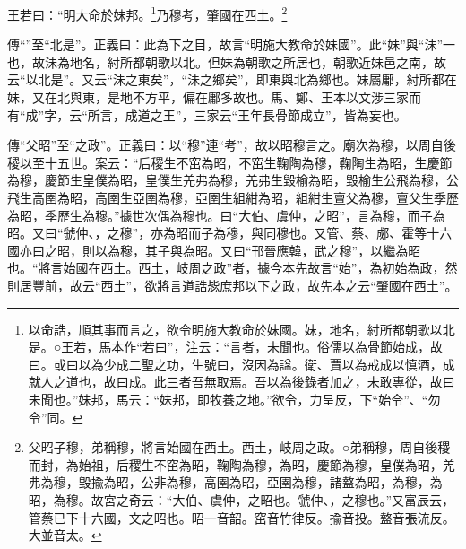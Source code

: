 王若曰：“明大命於妹邦。\footnote{以命誥，順其事而言之，欲令明施大教命於妹國。妹，地名，紂所都朝歌以北是。○王若，馬本作“若曰”，注云：“言者，未聞也。俗儒以為骨節始成，故曰。或曰以為少成二聖之功，生號曰，沒因為諡。衛、賈以為戒成以慎酒，成就人之道也，故曰成。此三者吾無取焉。吾以為後錄者加之，未敢專從，故曰未聞也。”妹邦，馬云：“妹邦，即牧養之地。”欲令，力呈反，下“始令”、“勿令”同。}乃穆考，肇國在西土。\footnote{父昭子穆，弟稱穆，將言始國在西土。西土，岐周之政。○弟稱穆，周自後稷而封，為始祖，后稷生不窋為昭，鞠陶為穆，為昭，慶節為穆，皇僕為昭，羌弗為穆，毀揄為昭，公非為穆，高圉為昭，亞圉為穆，諸盩為昭，為穆，為昭，為穆。故宮之奇云：“大伯、虞仲，之昭也。虢仲、，之穆也。”又富辰云，管蔡已下十六國，文之昭也。昭一音韶。窋音竹律反。揄音投。盩音張流反。大並音太。}


{\noindent\zhuan{}\fzbyks 傳“”至“北是”。正義曰：此為下之目，故言“明施大教命於妹國”。此“妹”與“沬”一也，故沬為地名，紂所都朝歌以北。但妹為朝歌之所居也，朝歌近妹邑之南，故云“以北是”。又云“沬之東矣”，“沬之鄉矣”，即東與北為鄉也。妹屬鄘，紂所都在妹，又在北與東，是地不方平，偏在鄘多故也。馬、鄭、王本以文涉三家而有“成”字，云“所言，成道之王”，三家云“王年長骨節成立”，皆為妄也。 \par}

{\noindent\zhuan{}\fzbyks 傳“父昭”至“之政”。正義曰：以“穆”連“考”，故以昭穆言之。廟次為穆，以周自後稷以至十五世。案云：“后稷生不窋為昭，不窋生鞠陶為穆，鞠陶生為昭，生慶節為穆，慶節生皇僕為昭，皇僕生羌弗為穆，羌弗生毀榆為昭，毀榆生公飛為穆，公飛生高圉為昭，高圉生亞圉為穆，亞圉生組紺為昭，組紺生亶父為穆，亶父生季歷為昭，季歷生為穆。”據世次偶為穆也。曰“大伯、虞仲，之昭”，言為穆，而子為昭。又曰“虢仲、，之穆”，亦為昭而子為穆，與同穆也。又管、蔡、郕、霍等十六國亦曰之昭，則以為穆，其子與為昭。又曰“邗晉應韓，武之穆”，以繼為昭也。“將言始國在西土。西土，岐周之政”者，據今本先故言“始”，為初始為政，然則居豐前，故云“西土”，欲將言道誥毖庶邦以下之政，故先本之云“肇國在西土”。 \par}

